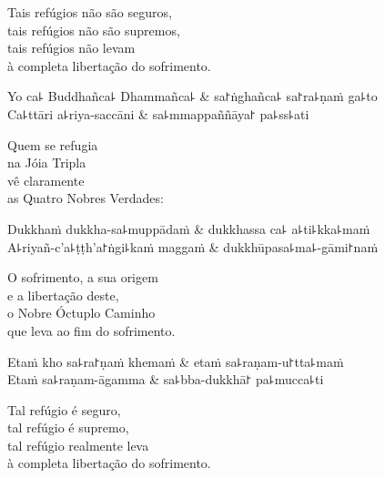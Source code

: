 \begin{english}
  Tais refúgios não são seguros,\\
  tais refúgios não são supremos,\\
  tais refúgios não levam\\
  à completa libertação do sofrimento.
\end{english}

\begin{twochants}
  Yo ca꜕ Buddhañca꜕ Dhammañca꜕ & sa꜓ṅghañca꜕ sa꜓ra꜕ṇaṁ ga꜕to \\
  Ca꜕ttāri a꜕riya-saccāni & sa꜕mmappaññāya꜓ pa꜕ss꜕ati \\
\end{twochants}

\begin{english}
  Quem se refugia\\
  na Jóia Tripla\\
  vê claramente\\
  as Quatro Nobres Verdades:
\end{english}

\begin{twochants}
  Dukkhaṁ dukkha-sa꜕muppādaṁ & dukkhassa ca꜕ a꜕ti꜕kka꜕maṁ \\
  A꜕riyañ-c'a꜕ṭṭh'a꜓ṅgi꜕kaṁ maggaṁ & dukkhūpasa꜕ma꜕-gāmi꜓naṁ \\
\end{twochants}

\begin{english}
  O sofrimento, a sua origem \\
  e a libertação deste,\\
  o Nobre Óctuplo Caminho\\
  que leva ao fim do sofrimento.
\end{english}

\begin{twochants}
  Etaṁ kho sa꜕ra꜓ṇaṁ khemaṁ & etaṁ sa꜕raṇam-u꜓tta꜕maṁ \\
  Etaṁ sa꜕raṇam-āgamma & sa꜕bba-dukkhā꜓ pa꜕mucca꜕ti \\
\end{twochants}

\begin{english}
  Tal refúgio é seguro,\\
  tal refúgio é supremo,\\
  tal refúgio realmente leva\\
  à completa libertação do sofrimento.
\end{english}

